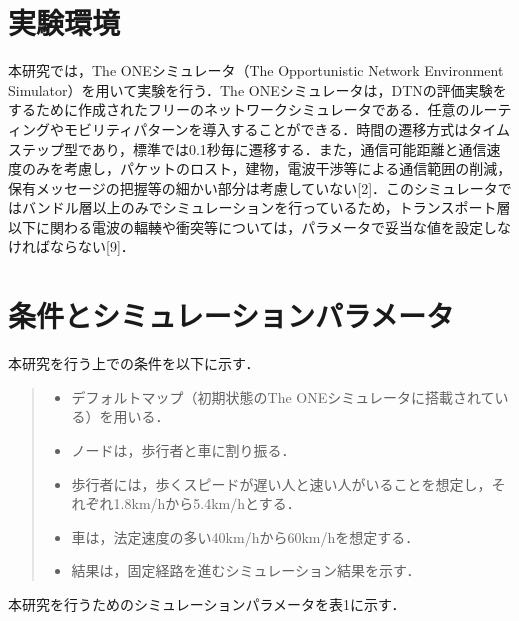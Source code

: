\documentclass[11pt]{icsthesis}
\begin{document}
\section{実験環境}
本研究では，The ONEシミュレータ（The Opportunistic Network Environment Simulator）を用いて実験を行う．The ONEシミュレータは，DTNの評価実験をするために作成されたフリーのネットワークシミュレータである．任意のルーティングやモビリティパターンを導入することができる．時間の遷移方式はタイムステップ型であり，標準では0.1秒毎に遷移する．また，通信可能距離と通信速度のみを考慮し，パケットのロスト，建物，電波干渉等による通信範囲の削減，保有メッセージの把握等の細かい部分は考慮していない[2]．このシミュレータではバンドル層以上のみでシミュレーションを行っているため，トランスポート層以下に関わる電波の輻輳や衝突等については，パラメータで妥当な値を設定しなければならない[9]．

\section{条件とシミュレーションパラメータ}
本研究を行う上での条件を以下に示す．
\begin{quote}
 \begin{itemize}
  \item デフォルトマップ（初期状態のThe ONEシミュレータに搭載されている）を用いる．
  \item ノードは，歩行者と車に割り振る．
  \item 歩行者には，歩くスピードが遅い人と速い人がいることを想定し，それぞれ1.8km/hから5.4km/hとする．
  \item 車は，法定速度の多い40km/hから60km/hを想定する．
  \item 結果は，固定経路を進むシミュレーション結果を示す．
 \end{itemize}
\end{quote}
本研究を行うためのシミュレーションパラメータを表1に示す．
\end{document}
